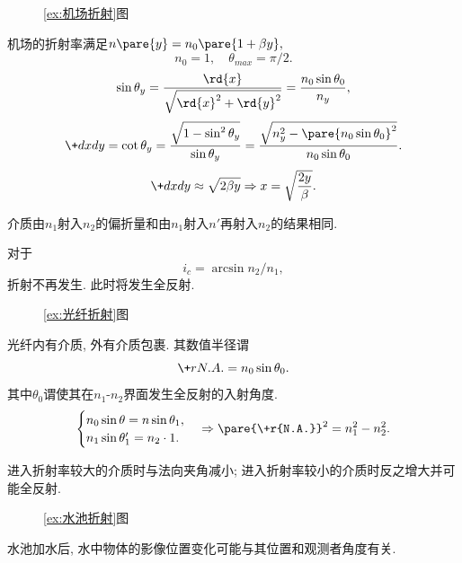 \documentclass{ctexart}
\begin{document}
\begin{figure}[ht]
    \centering
    \caption{\cref{ex:机场折射}图}
\end{figure}
\begin{sample}
    \begin{ex}
        \label{ex:机场折射}
        机场的折射率满足$n\pare{y} = n_0\pare{1+\beta y},$
        \[ n_0 = 1,\quad \theta_{max} = \pi/2. \]
        \[ \sin \theta_y = \frac{\rd{x}}{\sqrt{\rd{x}^2 + \rd{y}^2}} = \frac{n_0\sin\theta_0}{n_y}, \]
        \[ \+dxdy = \cot\theta_y = \frac{\sqrt{1-\sin^2\theta_y}}{\sin\theta_y} = \frac{\sqrt{n_y^2 - \pare{n_0\sin\theta_0}^2}}{n_0\sin\theta_0}. \]
        \[ \+dxdy \approx \sqrt{2\beta y} \Rightarrow x = \sqrt{\frac{2y}{\beta}}. \]
    \end{ex}
\end{sample}
\begin{finale}
    介质由$n_1$射入$n_2$的偏折量和由$n_1$射入$n'$再射入$n_2$的结果相同.
\end{finale}
\begin{lemma}[临界折射角]
    对于
    \[ i_c = \arcsin n_2/n_1, \]
    折射不再发生. 此时将发生全反射.
\end{lemma}
\begin{figure}[ht]
    \centering
    \caption{\cref{ex:光纤折射}图}
\end{figure}
\begin{sample}
    \begin{ex}
        \label{ex:光纤折射}
        光纤内有介质, 外有介质包裹. 其数值半径谓
        \[ \+r{N.A.} = n_0\sin\theta_0. \]
        其中$\theta_0$谓使其在$n_1$-$n_2$界面发生全反射的入射角度.
        \[ \begin{cases}
            n_0\sin\theta = n\sin\theta_1,\\
            n_1\sin\theta'_1 = n_2 \cdot 1.
        \end{cases} \Rightarrow \pare{\+r{N.A.}}^2 = n_1^2 - n_2^2. \]
    \end{ex}
\end{sample}
\begin{finale}
    进入折射率较大的介质时与法向夹角减小; 进入折射率较小的介质时反之增大并可能全反射.
\end{finale}
\begin{figure}[ht]
    \centering
    \caption{\cref{ex:水池折射}图}
\end{figure}
\begin{sample}
    \begin{ex}
        \label{ex:水池折射}
        水池加水后, 水中物体的影像位置变化可能与其位置和观测者角度有关.
    \end{ex}
\end{sample}
\end{document}
